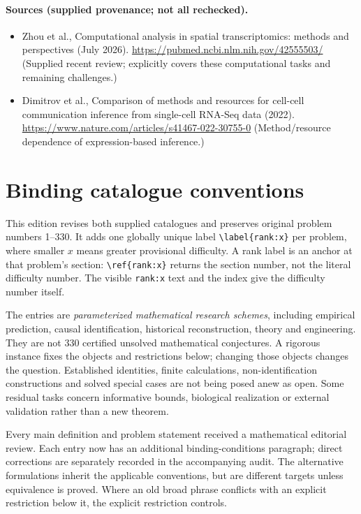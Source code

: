 \documentclass[11pt]{article}
\begin{document}
\paragraph{Sources (supplied provenance; not all rechecked).}
\begin{itemize}
\item Zhou et al., Computational analysis in spatial transcriptomics: methods and perspectives (July 2026). \url{https://pubmed.ncbi.nlm.nih.gov/42555503/} (Supplied recent review; explicitly covers these computational tasks and remaining challenges.)
\item Dimitrov et al., Comparison of methods and resources for cell-cell communication inference from single-cell RNA-Seq data (2022). \url{https://www.nature.com/articles/s41467-022-30755-0} (Method/resource dependence of expression-based inference.)
\end{itemize}


\section*{Binding catalogue conventions}
This edition revises both supplied catalogues and preserves original problem numbers 1--330. It adds one globally unique label \verb|\label{rank:x}| per problem, where smaller $x$ means greater provisional difficulty. A rank label is an anchor at that problem's section: \verb|\ref{rank:x}| returns the section number, not the literal difficulty number. The visible \texttt{rank:x} text and the index give the difficulty number itself.

The entries are \emph{parameterized mathematical research schemes}, including empirical prediction, causal identification, historical reconstruction, theory and engineering. They are not 330 certified unsolved mathematical conjectures. A rigorous instance fixes the objects and restrictions below; changing those objects changes the question. Established identities, finite calculations, non-identification constructions and solved special cases are not being posed anew as open. Some residual tasks concern informative bounds, biological realization or external validation rather than a new theorem.

Every main definition and problem statement received a mathematical editorial review. Each entry now has an additional binding-conditions paragraph; direct corrections are separately recorded in the accompanying audit. The alternative formulations inherit the applicable conventions, but are different targets unless equivalence is proved. Where an old broad phrase conflicts with an explicit restriction below it, the explicit restriction controls.
\end{document}
